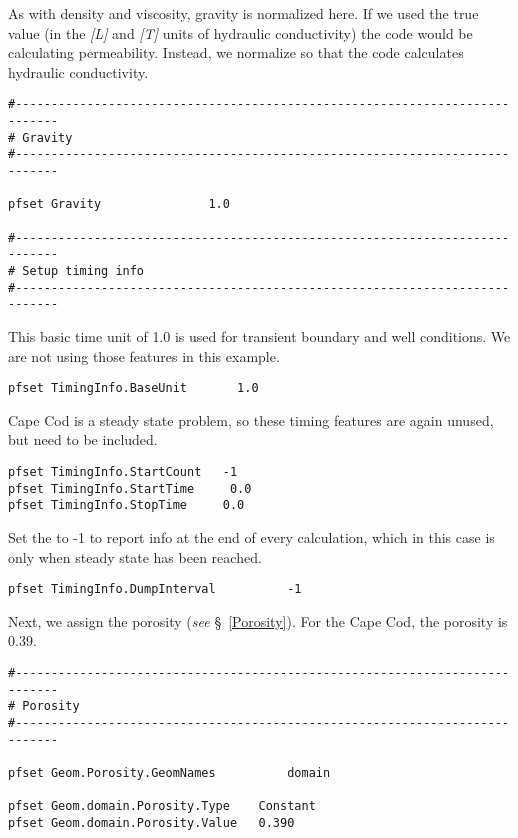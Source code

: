 As with density and viscosity, gravity is normalized here.  If we used the true value
(in the \emph{[L]} and \emph{[T]} units of hydraulic conductivity) the code would be calculating permeability.  
Instead, we normalize so that the code calculates hydraulic conductivity.

\begin{verbatim}
#----------------------------------------------------------------------------
# Gravity
#----------------------------------------------------------------------------

pfset Gravity				1.0

#----------------------------------------------------------------------------
# Setup timing info
#----------------------------------------------------------------------------
\end{verbatim}

This basic time unit of 1.0 is used for transient boundary and well conditions. 
We are not using those features in this example.

\begin{verbatim} 
pfset TimingInfo.BaseUnit		1.0
\end{verbatim}

Cape Cod is a steady state problem, so these timing features are again unused, but need to be included.

\begin{verbatim}
pfset TimingInfo.StartCount   -1
pfset TimingInfo.StartTime     0.0
pfset TimingInfo.StopTime     0.0
\end{verbatim}

Set the  to -1 to report info at the end of every calculation, 
which in this case is only when steady state has been reached.

\begin{verbatim}
pfset TimingInfo.DumpInterval	       -1
\end{verbatim}

Next, we assign the porosity (\emph{see} \S~\ref{Porosity}).  For the Cape Cod, the porosity is 0.39.  

\begin{verbatim}
#----------------------------------------------------------------------------
# Porosity
#----------------------------------------------------------------------------

pfset Geom.Porosity.GeomNames          domain

pfset Geom.domain.Porosity.Type    Constant
pfset Geom.domain.Porosity.Value   0.390
\end{verbatim}

